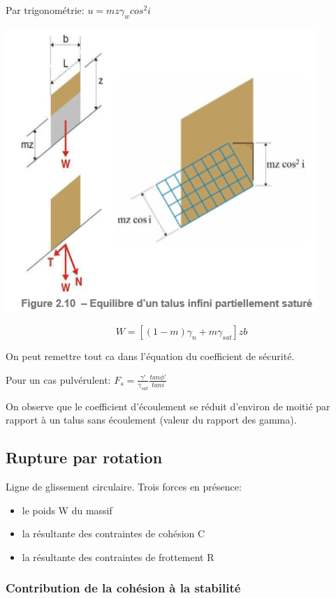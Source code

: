 Par trigonométrie: $u = mz \gamma_w cos^2i$ 

\begin{center}
\includegraphics [scale=0.5]{pictures/zr.PNG}
\end{center}

$$ W = [(1-m) \gamma_n + m\gamma_{sat}]z b $$ 

On peut remettre tout ca dans l'équation du coefficient de sécurité.

Pour un cas pulvérulent: $F_s = \frac{\gamma'}{\gamma_{sat}} \frac{tan \phi'}{tan i}$

On observe que le coefficient d'écoulement se réduit d'environ de moitié par rapport à un talus sans écoulement (valeur du rapport des gamma).

\subsection{Rupture par rotation}

Ligne de glissement circulaire. Trois forces en présence: 
\begin{itemize}
    \item le poids W du massif
    \item la résultante des contraintes de cohésion C
    \item la résultante des contraintes de frottement R
\end{itemize}

\subsubsection{Contribution de la cohésion à la stabilité}

